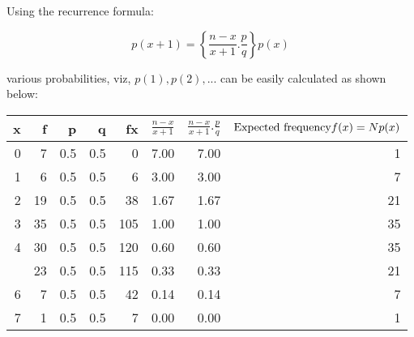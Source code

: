 \documentclass[ignorenonframetext,aspectratio=169]{beamer}
\begin{document}
\begin{frame}{}
\protect\hypertarget{section-30}{}

Using the recurrence formula:

\[
p(x + 1) = \left\{\frac{n-x}{x+1}.\frac{p}{q}\right\} p(x)
\]

various probabilities, viz, \(p(1), p(2), ...\) can be easily calculated
as shown below:

\begin{table}[H]
\centering\begingroup\fontsize{6}{8}\selectfont

\begin{tabular}{rrrrrrrr}
\toprule
x & f & p & q & fx & $\frac{n-x}{x+1}$ & $\frac{n-x}{x+1}.\frac{p}{q}$ & $\text{Expected frequency} \newline f(x) = Np(x)$\\
\midrule
0 & 7 & 0.5 & 0.5 & 0 & 7.00 & 7.00 & 1\\
1 & 6 & 0.5 & 0.5 & 6 & 3.00 & 3.00 & 7\\
2 & 19 & 0.5 & 0.5 & 38 & 1.67 & 1.67 & 21\\
3 & 35 & 0.5 & 0.5 & 105 & 1.00 & 1.00 & 35\\
4 & 30 & 0.5 & 0.5 & 120 & 0.60 & 0.60 & 35\\
\addlinespace
5 & 23 & 0.5 & 0.5 & 115 & 0.33 & 0.33 & 21\\
6 & 7 & 0.5 & 0.5 & 42 & 0.14 & 0.14 & 7\\
7 & 1 & 0.5 & 0.5 & 7 & 0.00 & 0.00 & 1\\
\bottomrule
\end{tabular}
\endgroup{}
\end{table}

\end{frame}
\end{document}
